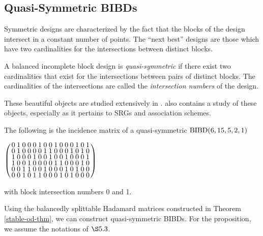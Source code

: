 \documentclass[../../../main]{subfiles}
\begin{document}
\subsection{Quasi-Symmetric BIBDs}

Symmetric designs are characterized by the fact that the blocks of the design intersect in a constant number of points. The ``next best'' designs are those which have two cardinalities for the intersections between distinct blocks.

\begin{defin}
 A balanced incomplete block design is {\it quasi-symmetric} if there exist two
 cardinalities that exist for the intersections between pairs of distinct
 blocks. The cardinalities of the intersections are called the {\it intersection
   numbers} of the design.
\end{defin}

These beautiful objects are studied extensively in \cite{quasi-symmetric-shrikhande}. \cite{combinatorics-of-symmetric-designs} also contains a study of these objects, especially as it pertains to SRGs and association schemes. 

\begin{ex}
 The following is the incidence matrix of a quasi-symmetric $\text{BIBD}(6,15,5,2,1)$
 \begin{defenum}
  \item\label{quasi-sym-ex} $
  \arraycolsep=1.25pt\def\arraystretch{0.625}
  \left(\begin{array}{rrrrrrrrrrrrrrr}
0 & 1 & 0 & 0 & 0 & 1 & 0 & 0 & 1 & 0 & 0 & 0 & 1 & 0 & 1 \\
0 & 1 & 0 & 0 & 0 & 0 & 1 & 1 & 0 & 0 & 0 & 1 & 0 & 1 & 0 \\
1 & 0 & 0 & 0 & 1 & 0 & 0 & 1 & 0 & 0 & 1 & 0 & 0 & 0 & 1 \\
1 & 0 & 0 & 1 & 0 & 0 & 0 & 0 & 1 & 1 & 0 & 0 & 0 & 1 & 0 \\
0 & 0 & 1 & 1 & 0 & 0 & 1 & 0 & 0 & 0 & 1 & 0 & 1 & 0 & 0 \\
0 & 0 & 1 & 0 & 1 & 1 & 0 & 0 & 0 & 1 & 0 & 1 & 0 & 0 & 0
\end{array}\right)
  $
 \end{defenum}
 with block intersection numbers 0 and 1.
\end{ex}

Using the balancedly splittable Hadamard matrices constructed in Theorem
\ref{stable-od-thm}, we can construct quasi-symmetric BIBDs. For the proposition,
we assume the notations of $\S5.3$. 
\end{document}
